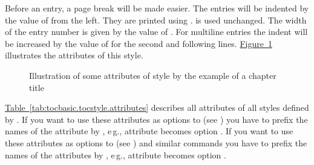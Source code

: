 \begin{description}
  Before an entry, a page break will be made easier. The entries will be
  indented by the value of  from the left. They are printed
  using .  is used unchanged. The width of
  the entry number is given by the value of . For multiline
  entries the indent will be increased by the value of  for
  the second and following lines. \hyperref[fig:tocbasic.undottedtocline]%
  {Figure~\ref*{fig:tocbasic.undottedtocline}} illustrates the attributes of
  this style.
  \begin{figure}
    \centering
    \caption{Illustration of some attributes of style 
      by the example of a chapter title}%
    \label{fig:tocbasic.undottedtocline}
  \end{figure}
\end{description}
\hyperref[tab:tocbasic.tocstyle.attributes]%
{Table~\ref*{tab:tocbasic.tocstyle.attributes}} describes all attributes of
all styles defined by
. If you want
to use these attributes as options to  (see
) you have to prefix the names of
the attribute by , e\,g., attribute  becomes
option .
If you want to use
these attributes as options to  (see
) and similar
commands you have to prefix the names of the attributes by ,
e\,g., attribute  becomes option .

